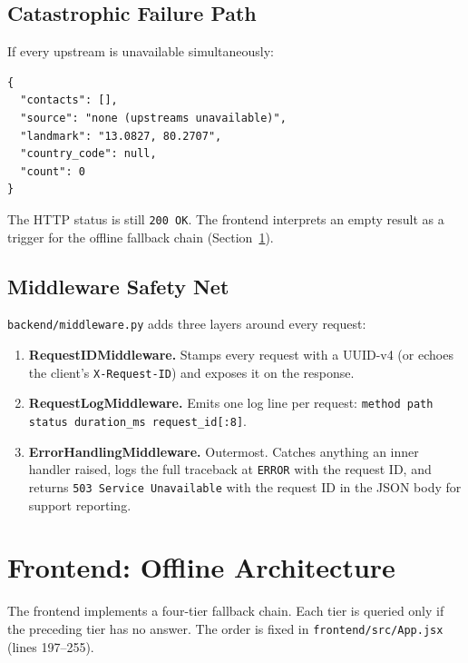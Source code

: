 \documentclass[11pt, a4paper]{article}
\newcommand{\file}[1]{\texttt{\small\color{rsblue}#1}}
\newcommand{\code}[1]{\texttt{\small#1}}
\begin{document}
\subsection{Catastrophic Failure Path}

If every upstream is unavailable simultaneously:

\begin{lstlisting}[numbers=none,caption={Response when all upstreams fail}]
{
  "contacts": [],
  "source": "none (upstreams unavailable)",
  "landmark": "13.0827, 80.2707",
  "country_code": null,
  "count": 0
}
\end{lstlisting}

The HTTP status is still \texttt{200 OK}. The frontend interprets an empty result as a trigger for the offline fallback chain (Section~\ref{sec:offline}).

\subsection{Middleware Safety Net}

\file{backend/middleware.py} adds three layers around every request:

\begin{enumerate}[leftmargin=*, itemsep=2pt, topsep=2pt]
  \item \textbf{RequestIDMiddleware.} Stamps every request with a UUID-v4 (or echoes the client's \code{X-Request-ID}) and exposes it on the response.
  \item \textbf{RequestLogMiddleware.} Emits one log line per request: \code{method path status duration\_ms request\_id[:8]}.
  \item \textbf{ErrorHandlingMiddleware.} Outermost. Catches anything an inner handler raised, logs the full traceback at \texttt{ERROR} with the request ID, and returns \code{503 Service Unavailable} with the request ID in the JSON body for support reporting.
\end{enumerate}

\section{Frontend: Offline Architecture}
\label{sec:offline}

The frontend implements a four-tier fallback chain. Each tier is queried only if the preceding tier has no answer. The order is fixed in \file{frontend/src/App.jsx} (lines 197--255).
\end{document}
